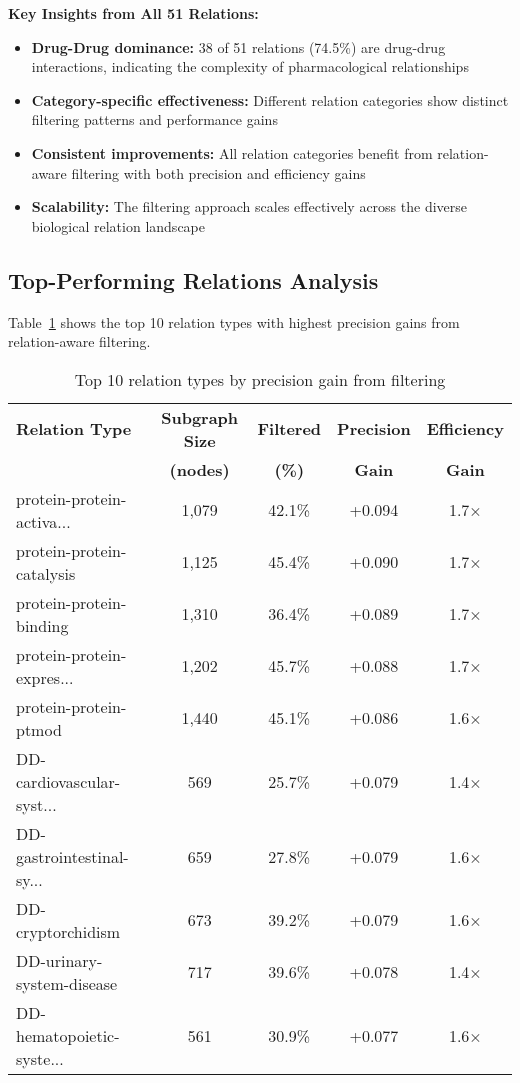 \textbf{Key Insights from All 51 Relations:}
\begin{itemize}
\item \textbf{Drug-Drug dominance:} 38 of 51 relations (74.5\%) are drug-drug interactions, indicating the complexity of pharmacological relationships
\item \textbf{Category-specific effectiveness:} Different relation categories show distinct filtering patterns and performance gains
\item \textbf{Consistent improvements:} All relation categories benefit from relation-aware filtering with both precision and efficiency gains
\item \textbf{Scalability:} The filtering approach scales effectively across the diverse biological relation landscape
\end{itemize}

\subsection{Top-Performing Relations Analysis}

Table~\ref{tab:top_relations} shows the top 10 relation types with highest precision gains from relation-aware filtering.

\begin{table}[h]
\centering
\caption{Top 10 relation types by precision gain from filtering}
\label{tab:top_relations}
\begin{tabular}{lcccc}
\toprule
\textbf{Relation Type} & \textbf{Subgraph Size} & \textbf{Filtered} & \textbf{Precision} & \textbf{Efficiency} \\
& \textbf{(nodes)} & \textbf{(\%)} & \textbf{Gain} & \textbf{Gain} \\
\midrule
protein-protein-activa... & 1,079 & 42.1\% & +0.094 & 1.7× \\
protein-protein-catalysis & 1,125 & 45.4\% & +0.090 & 1.7× \\
protein-protein-binding & 1,310 & 36.4\% & +0.089 & 1.7× \\
protein-protein-expres... & 1,202 & 45.7\% & +0.088 & 1.7× \\
protein-protein-ptmod & 1,440 & 45.1\% & +0.086 & 1.6× \\
DD-cardiovascular-syst... & 569 & 25.7\% & +0.079 & 1.4× \\
DD-gastrointestinal-sy... & 659 & 27.8\% & +0.079 & 1.6× \\
DD-cryptorchidism & 673 & 39.2\% & +0.079 & 1.6× \\
DD-urinary-system-disease & 717 & 39.6\% & +0.078 & 1.4× \\
DD-hematopoietic-syste... & 561 & 30.9\% & +0.077 & 1.6× \\
\bottomrule
\end{tabular}
\end{table}

